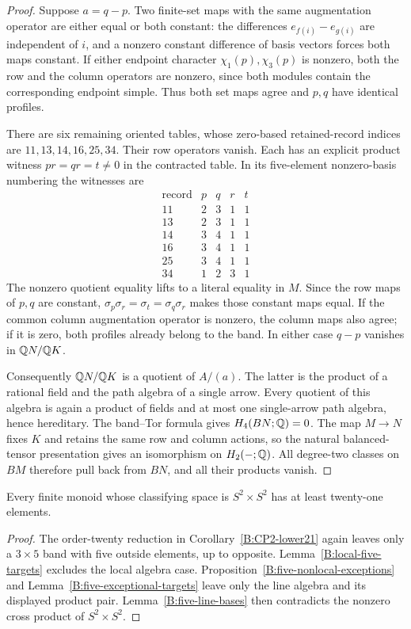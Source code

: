 \begin{proof}
Suppose $a=q-p$.  Two finite-set maps with the same augmentation
operator are either equal or both constant: the differences
$e_{f(i)}-e_{g(i)}$ are independent of $i$, and a nonzero
constant difference of basis vectors forces both maps constant.
If either endpoint character $\chi_1(p),\chi_3(p)$ is nonzero,
both the row and the column operators are nonzero, since both
modules contain the corresponding endpoint simple.  Thus both
set maps agree and $p,q$ have identical profiles.

There are six remaining oriented tables, whose zero-based
retained-record indices are $11,13,14,16,25,34$.
Their row operators vanish.  Each has an explicit product
witness $pr=qr=t\ne0$ in the contracted table.  In its
five-element nonzero-basis numbering the witnesses are
\[
\begin{array}{c|rrrr}
\text{record}&p&q&r&t\\\hline
11&2&3&1&1\\
13&2&3&1&1\\
14&3&4&1&1\\
16&3&4&1&1\\
25&3&4&1&1\\
34&1&2&3&1
\end{array}
\]
The nonzero quotient equality lifts to a literal equality in
$M$.  Since the row maps of $p,q$ are constant,
$\sigma_p\sigma_r=\sigma_t=\sigma_q\sigma_r$ makes those
constant maps equal.  If the common column augmentation
operator is nonzero, the column maps also agree; if it is zero,
both profiles already belong to the band.  In either case
$q-p$ vanishes in $\mathbb Q N/\mathbb Q K$.

Consequently $\mathbb Q N/\mathbb Q K$ is a quotient of $A/(a)$.
The latter is the product of a rational field and the path
algebra of a single arrow.  Every quotient of this algebra is
again a product of fields and at most one single-arrow path
algebra, hence hereditary.  The band--Tor formula gives
$H_4(BN;\mathbb Q)=0$.
The map $M\to N$ fixes $K$ and retains the same row and column
actions, so the natural balanced-tensor presentation gives an
isomorphism on $H_2(-;\mathbb Q)$.  All degree-two classes on $BM$
therefore pull back from $BN$, and all their products vanish.
\end{proof}

\begin{corollary}\label{B:product-lower21}
Every finite monoid whose classifying space is $S^2\times S^2$
has at least twenty-one elements.
\end{corollary}
\begin{proof}
The order-twenty reduction in Corollary~\ref{B:CP2-lower21}
again leaves only a $3\times5$ band with five outside elements,
up to opposite.  Lemma~\ref{B:local-five-targets} excludes the
local algebra case.  Proposition~\ref{B:five-nonlocal-exceptions}
and Lemma~\ref{B:five-exceptional-targets} leave only the line
algebra and its displayed product pair.  Lemma~\ref{B:five-line-bases}
then contradicts the nonzero cross product of $S^2\times S^2$.
\end{proof}
